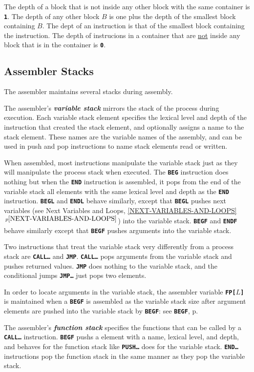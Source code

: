 \documentclass[12pt]{article}
\newcommand{\TT}[1]{{\tt \bfseries #1}}
\newcommand{\key}[1]{{\bf \em #1}\index{#1}}
\newcommand{\itemref}[1]{\ref{#1}$\,^{p\pageref{#1}}$}
\newcommand{\pagref}[1]{p\pageref{#1}}
\begin{document}
The depth of a block that is not inside any other block with
the same container is \TT{1}.  The depth of any other block $B$
is one plus the depth of the smallest block containing $B$.
The dept of an instruction
is that of the smallest block containing the instruction.
The depth of instrucions in a container
that are \underline{not} inside any block that is in the container
is \TT{0}.

\subsection{Assembler Stacks}
\label{ASSEMBLER-STACKS}

The assembler maintains several stacks during assembly.

The assembler's \key{variable stack} mirrors the stack of
the process during execution.  Each variable stack
element specifies the lexical level and depth of the
instruction that created the stack element, and optionally
assigns a name to the stack element.  These names are the
variable names of the assembly, and can be used in
push and pop instructions to name stack elements read or
written.

When assembled, most instructions manipulate the variable
stack just as they will manipulate the process stack
when executed.  The \TT{BEG} instruction does nothing
but when the \TT{END} instruction is assembled, it pops
from the end of the variable stack all elements with
the same lexical level and depth as the \TT{END} instruction.
\TT{BEGL} and \TT{ENDL} behave similarly, except that
\TT{BEGL} pushes next variables (see Next Variables and Loops,
\itemref{NEXT-VARIABLES-AND-LOOPS}) into the variable stack.
\TT{BEGF} and \TT{ENDF} behave similarly except that \TT{BEGF}
pushes arguments into the variable stack.

Two instructions that treat the variable stack very differently
from a process stack are \TT{CALL\ldots} and \TT{JMP}.  \TT{CALL\ldots}
pops arguments from the variable stack and pushes returned values.
\TT{JMP} does nothing to the variable stack, and the conditional
jumps \TT{JMP\ldots} just pops two elements.

In order to locate arguments in the variable stack, the assembler variable
\TT{FP[$L$]} is maintained when a \TT{BEGF} is assembled as the
variable stack size after argument elements are pushed into the
variable stack by \TT{BEGF}: see \TT{BEGF}, \pagref{BEGF}.

The assembler's \key{function stack} specifies the functions that
can be called by a \TT{CALL\ldots} instruction.  \TT{BEGF} pushs
a element with a name, lexical level, and depth, and behaves
for the function stack like \TT{PUSH\ldots} does for the variable stack.
\TT{END\ldots} instructions pop the function stack in the same manner as
they pop the variable stack.
\end{document}
